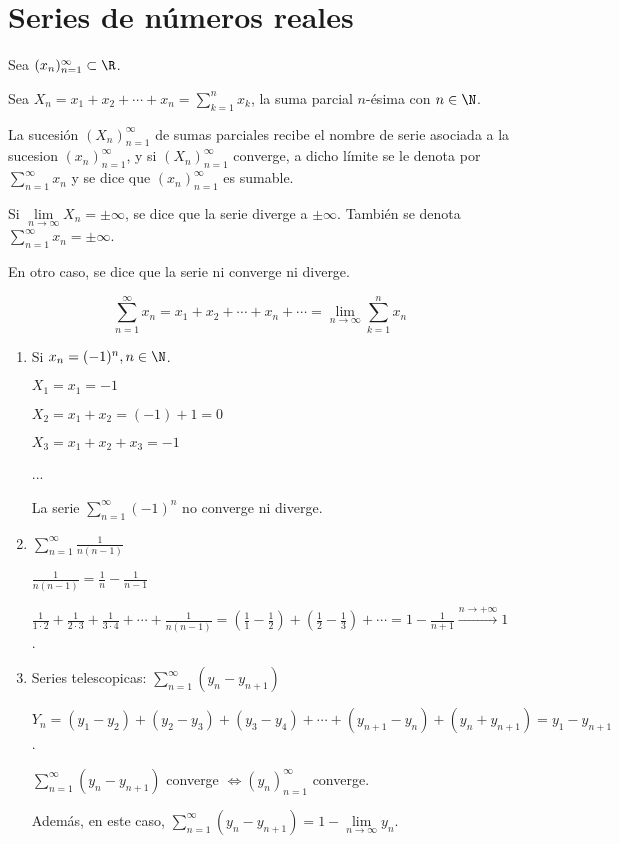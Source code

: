 \section{Series de números reales}
\begin{definition}[Serie]
	Sea \((x_n)^{\infty}_{n=1} \subset \R \).

	Sea \(X_n = x_1 + x_2 + \cdots + x_n = \sum_{k =1}^{n } x_k \), la suma parcial \(n\)-ésima con \(n \in \N \).

	La sucesión \((X_n)^{\infty}_{n=1} \) de sumas parciales recibe el nombre de serie asociada a la sucesion \((x_n)^{\infty}_{n=1} \), y si \((X_n)^{\infty}_{n=1} \) converge, a dicho límite se le denota por \(\sum_{n =1}^{\infty} x_n \) y se dice que \((x_n)^{\infty}_{n=1} \) es sumable.

	Si \(\lim\limits_{n \to \infty} X_n = \pm\infty \), se dice que la serie diverge a \(\pm\infty \). También se denota \(\sum_{n =1}^{\infty} x_n = \pm \infty \).

	En otro caso, se dice que la serie ni converge ni diverge.
\end{definition}
\begin{remark}
	\[
		\sum_{n =1}^{\infty} x_n = x_1 + x_2 + \cdots + x_n + \cdots = \lim\limits_{n \to \infty} \sum_{k =1}^{n } x_n
	\]
\end{remark}
\begin{example}
	\begin{enumerate}
		\item Si \(x_n = (-1)^{n }, n \in \N \).

		      \(X_1 = x_1 = -1 \)

		      \(X_2 = x_1 + x_2 = (-1) + 1 = 0 \)

		      \(X_3 = x_1 + x_2 + x_3 = -1 \)

		      ...

		      La serie \(\sum_{n =1}^{\infty} (-1)^{n} \) no converge ni diverge.
		\item \(\sum_{n =1}^{\infty} \frac{1 }{n(n-1)}\)

		      \(\frac{1}{n(n-1)} = \frac{1}{n } - \frac{1}{n-1 }\)

		      \(\frac{1}{1 \cdot 2 } + \frac{1}{2 \cdot 3 } + \frac{1}{3 \cdot 4 } + \cdots + \frac{1}{n(n-1)} = (\frac{1}{1} - \frac{1}{2}) + ( \frac{1}{2} - \frac{1}{3}) + \cdots = 1 - \frac{1}{n + 1} \overset{n \to +\infty}{\longrightarrow} 1\).
		\item Series telescopicas: \(\sum_{n =1}^{\infty} (y_n - y_{n+1})\)

		      \(Y_n = (y_1 - y_2) + (y_2 - y_3) + (y_3 - y_4) + \cdots + (y_{n+1} - y_n) + (y_n + y_{n+1}) = y_1 - y_{n+1}\).

		      \(\sum_{n =1}^{\infty} (y_n - y_{n+1})\) converge \(\iff (y_n)^{\infty}_{n=1} \) converge.

		      Además, en este caso, \(\sum_{n =1}^{\infty} (y_n - y_{n+1}) = 1 - \lim\limits_{n \to \infty} y_n \).
	\end{enumerate}
\end{example}
